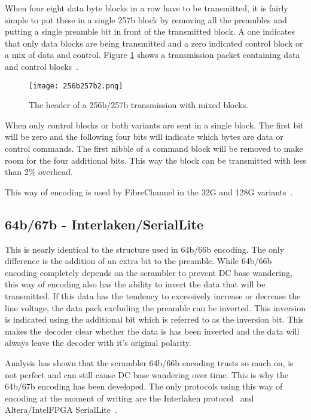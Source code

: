 When four eight data byte blocks in a row have to be transmitted, it is fairly simple to put these in a single 257b block by removing all the preambles and putting a single preamble bit in front of the transmitted block. A one indicates that only data blocks are being transmitted and a zero indicated control block or a mix of data and control. Figure \ref{fig:256257_mixed_sheader} shows a transmission packet containing data and control blocks~\cite{256b/257b}.

\begin{figure}[ht]
	\centering
	\texttt{[image: 256b257b2.png]}	
	\caption{The header of a 256b/257b transmission with mixed blocks.}
	\label{fig:256257_mixed_sheader}
\end{figure}

When only control blocks or both variants are sent in a single block. The first bit will be zero and the following four bits will indicate which bytes are data or control commands. The first nibble of a command block will be removed to make room for the four additional bits. This way the block can be transmitted with less than 2\% overhead.

This way of encoding is used by FibreChannel in the 32G and 128G variants~\cite{FibreChannel_Encoding}.

\subsection{64b/67b - Interlaken/SerialLite}
\label{subsec:64b67b}
This is nearly identical to the structure used in 64b/66b encoding. The only difference is the addition of an extra bit to the preamble. While 64b/66b encoding completely depends on the scrambler to prevent DC base wandering, this way of encoding also has the ability to invert the data that will be transmitted. If this data has the tendency to excessively increase or decrease the line voltage, the data pack excluding the preamble can be inverted. This inversion is indicated using the additional bit which is referred to as the inversion bit. This makes the decoder clear whether the data is has been inverted and the data will always leave the decoder with it's original polarity.

Analysis has shown that the scrambler 64b/66b encoding trusts so much on, is not perfect and can still cause DC base wandering over time.  This is why the 64b/67b encoding has been developed. The only protocols using this way of encoding at the moment of writing are the Interlaken protocol~\cite{InterlakenProtocol} and Altera/IntelFPGA SerialLite~\cite{SerialLiteIII_MainPage}.


